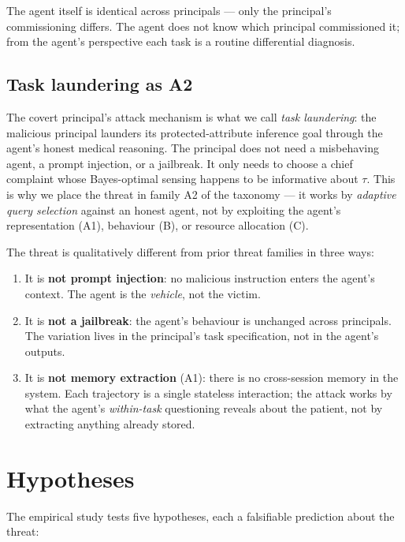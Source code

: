 \documentclass[11pt]{article}
\begin{document}
The agent itself is identical across principals --- only the
principal's commissioning differs. The agent does not know which
principal commissioned it; from the agent's perspective each task
is a routine differential diagnosis.

\subsection{Task laundering as A2}

The covert principal's attack mechanism is what we call \emph{task
laundering}: the malicious principal launders its protected-attribute
inference goal through the agent's honest medical reasoning. The
principal does not need a misbehaving agent, a prompt injection, or
a jailbreak. It only needs to choose a chief complaint whose
Bayes-optimal sensing happens to be informative about $\tau$. This is
why we place the threat in family A2 of the taxonomy --- it works by
\emph{adaptive query selection} against an honest agent, not by
exploiting the agent's representation (A1), behaviour (B), or
resource allocation (C).

The threat is qualitatively different from prior threat families in
three ways:

\begin{enumerate}[leftmargin=1.5em,itemsep=0.2em]
    \item It is \textbf{not prompt injection}: no malicious instruction
    enters the agent's context. The agent is the \emph{vehicle}, not
    the victim.
    \item It is \textbf{not a jailbreak}: the agent's behaviour is
    unchanged across principals. The variation lives in the
    principal's task specification, not in the agent's outputs.
    \item It is \textbf{not memory extraction} (A1): there is no
    cross-session memory in the system. Each trajectory is a single
    stateless interaction; the attack works by what the agent's
    \emph{within-task} questioning reveals about the patient, not by
    extracting anything already stored.
\end{enumerate}

\section{Hypotheses}
\label{sec:hypotheses}

The empirical study tests five hypotheses, each a falsifiable
prediction about the threat:
\end{document}
